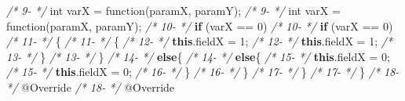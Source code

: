 \documentclass[
]{article}
\newenvironment{Shaded}{\begin{snugshade}}{\end{snugshade}}
\newcommand{\AttributeTok}[1]{\textcolor[rgb]{0.77,0.63,0.00}{#1}}
\newcommand{\CommentTok}[1]{\textcolor[rgb]{0.56,0.35,0.01}{\textit{#1}}}
\newcommand{\DataTypeTok}[1]{\textcolor[rgb]{0.13,0.29,0.53}{#1}}
\newcommand{\DecValTok}[1]{\textcolor[rgb]{0.00,0.00,0.81}{#1}}
\newcommand{\FunctionTok}[1]{\textcolor[rgb]{0.00,0.00,0.00}{#1}}
\newcommand{\KeywordTok}[1]{\textcolor[rgb]{0.13,0.29,0.53}{\textbf{#1}}}
\newcommand{\NormalTok}[1]{#1}
\begin{document}
\begin{landscape}
\begin{Shaded}
\begin{Highlighting}[]
\CommentTok{/*  9-                 */}        \DataTypeTok{int}\NormalTok{ varX = }\FunctionTok{function}\NormalTok{(paramX, paramY);                          }\CommentTok{/*  9-                 */}        \DataTypeTok{int}\NormalTok{ varX = }\FunctionTok{function}\NormalTok{(paramX, paramY);                           }
\CommentTok{/* 10-                 */}        \KeywordTok{if}\NormalTok{ (varX == }\DecValTok{0}\NormalTok{)                                         }\CommentTok{/* 10-                 */}        \KeywordTok{if}\NormalTok{ (varX == }\DecValTok{0}\NormalTok{)                                         }
\CommentTok{/* 11-                 */}\NormalTok{        \{                                                      }\CommentTok{/* 11-                 */}\NormalTok{        \{                                                      }
\CommentTok{/* 12-                 */}            \KeywordTok{this}\NormalTok{.}\FunctionTok{fieldX}\NormalTok{ = }\DecValTok{1}\NormalTok{;                                   }\CommentTok{/* 12-                 */}            \KeywordTok{this}\NormalTok{.}\FunctionTok{fieldX}\NormalTok{ = }\DecValTok{1}\NormalTok{;                                   }
\CommentTok{/* 13-                 */}\NormalTok{        \}                                                                }\CommentTok{/* 13-                 */}\NormalTok{        \}                                                                  }
\CommentTok{/* 14-                 */}        \KeywordTok{else}\NormalTok{\{                                                  }\CommentTok{/* 14-                 */}        \KeywordTok{else}\NormalTok{\{                                                  }
\CommentTok{/* 15-                 */}            \KeywordTok{this}\NormalTok{.}\FunctionTok{fieldX}\NormalTok{ = }\DecValTok{0}\NormalTok{;                                   }\CommentTok{/* 15-                 */}            \KeywordTok{this}\NormalTok{.}\FunctionTok{fieldX}\NormalTok{ = }\DecValTok{0}\NormalTok{;                                   }
\CommentTok{/* 16-                 */}\NormalTok{        \}                                                      }\CommentTok{/* 16-                 */}\NormalTok{        \}                                                      }
\CommentTok{/* 17-                 */}\NormalTok{    \}                                                          }\CommentTok{/* 17-                 */}\NormalTok{    \}                                                          }
\CommentTok{/* 18-                 */}    \AttributeTok{@Override}                                                  \CommentTok{/* 18-                 */}    \AttributeTok{@Override}                                                  

\end{Highlighting}
\end{Shaded}
\end{landscape}
\end{document}
